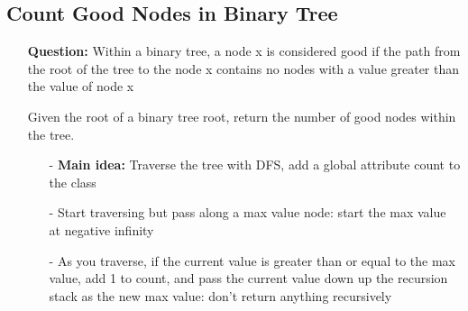 \documentclass[12pt]{article}
\begin{document}
\subsection{Count Good Nodes in Binary Tree}
\begin{enumerate}
  \item[] \textbf{Question:} Within a binary tree, a node x is considered good if the path from the root of the tree to the node x contains no nodes with a value greater than the value of node x

Given the root of a binary tree root, return the number of good nodes within the tree.

    \begin{enumerate}
      \item[-] \textbf{Main idea:} Traverse the tree with DFS, add a global attribute count to the class
      \item[-] Start traversing but pass along a max value node: start the max value at negative infinity
      \item[-] As you traverse, if the current value is greater than or equal to the max value, add 1 to count, and pass the current value down up the recursion stack as the new max value: don't return anything recursively 

    \end{enumerate}
\end{enumerate}
\end{document}
